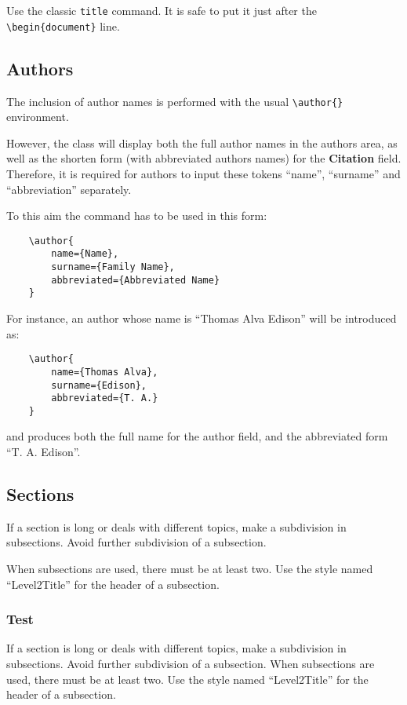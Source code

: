 \documentclass[10pt]{imeko_acta}
\begin{document}
Use the classic \verb|title| command. It is safe to put it just after the \verb|\begin{document}| line.

\subsection{Authors}

The inclusion of author names is performed with the usual \verb|\author{}| environment.

However, the class will display both the full author names in the authors area, as well as the shorten form (with abbreviated authors names) for the \textbf{Citation} field.
Therefore, it is required for authors to input these tokens ``name'', ``surname'' and ``abbreviation'' separately.

To this aim the command has to be used in this form:
\begin{verbatim}
	\author{
		name={Name},
		surname={Family Name},
		abbreviated={Abbreviated Name}
	}
\end{verbatim}

For instance, an author whose name is ``Thomas Alva Edison'' will be introduced as:
\begin{verbatim}
	\author{
		name={Thomas Alva},
		surname={Edison},
		abbreviated={T. A.}
	}
\end{verbatim}
and produces both the full name for the author field, and the abbreviated form ``T. A. Edison''.

\subsection{Sections}

If a section is long or deals with different topics, make a subdivision in subsections. Avoid further subdivision of a subsection. 

When subsections are used, there must be at least two. Use the style named ``Level2Title'' for the header of a subsection.

\subsubsection{Test}
If a section is long or deals with different topics, make a subdivision in subsections. Avoid further subdivision of a subsection. When subsections are used, there must be at least two. Use the style named ``Level2Title'' for the header of a subsection.
\end{document}

